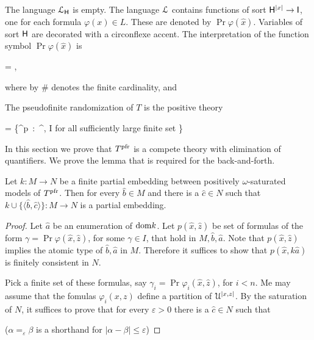 \documentclass[10pt,oneside]{amsproc}
\begin{document}
{The language ${\EuScript L}_{\sf H}$ is empty.
The language ${\EuScript L}$ contains functions of sort ${\sf H}^{|x|}\to{\sf I}$, one for each formula $\varphi(x)\in L$.
These are denoted by $\Pr\varphi(\hat x)$. 
Variables of sort ${\sf H}$ are decorated with a circonflexe accent.
The interpretation of the function symbol $\Pr\varphi(\hat x)$ is 

{=}
{,}

where by $\#$ denotes the finite cardinality, and


The pseudofinite randomization of $T$ is the positive theory

{=}
{\Big\{\varphi{}^{\rm p}\ :\ ^\Omega, I\rangle\models\varphi\textrm{ for all sufficiently large finite set }\Omega\Big\}}

In this section we prove that $T^{\rm pfr}$ is a compete theory with elimination of quantifiers.
We prove the lemma that is required for the back-and-forth.

\begin{lemma}
  Let $k:M\to N$ be a finite partial embedding between positively $\omega$-saturated models of $T^{\rm pfr}$.
  Then for every $\hat b\in M$ and there is a $\hat c\in N$ such that $k\cup\{\langle\hat b,\hat c\rangle\}:M\to N$ is a partial embedding.
\end{lemma}

\begin{proof}
  Let $\hat a$ be an enumeration of ${\rm dom} k$.
  Let $p(\hat x,\hat z)$ be set of formulas of the form $\gamma=\Pr\varphi(\hat x,\hat z)$, for some $\gamma\in I$, that hold in $M,\hat b,\hat a$.
  Note that $p(\hat x,\hat z)$ implies the atomic type of $\hat b,\hat a$ in $M$.
  Therefore it suffices to show that $p(\hat x,k\hat a)$ is finitely consistent in $N$.

  Pick a finite set of these formulas, say $\gamma_i=\Pr\varphi_i(\hat x,\hat z)$, for $i<n$.
  Me may assume that the fomulas $\varphi_i(x,z)$ define a partition of ${\EuScript U}^{|x,z|}$.
  By the saturation of $N$, it suffices to prove that for every $\varepsilon>0$ there is a $\hat c\in N$ such that
  
  \hfill ($\alpha=_\varepsilon\beta$ is a shorthand for $|\alpha-\beta|\le\varepsilon$)
  

\end{proof}}
\end{document}
